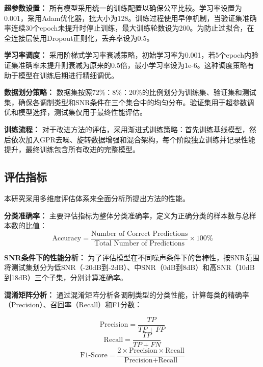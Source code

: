 \documentclass[conference]{IEEEtran}
\begin{document}
\textbf{超参数设置：}
所有模型采用统一的训练配置以确保公平比较。学习率设置为0.001，采用Adam优化器，批大小为128。训练过程使用早停机制，当验证集准确率连续30个epoch未提升时停止训练，最大训练轮数设为200。为防止过拟合，在全连接层使用Dropout正则化，丢弃率设为0.5。

\textbf{学习率调度：}
采用阶梯式学习率衰减策略，初始学习率为0.001，若5个epoch内验证集准确率未提升则衰减为原来的0.5倍，最小学习率设为1e-6。这种调度策略有助于模型在训练后期进行精细调优。

\textbf{数据划分策略：}
数据集按照72\%：8\%：20\%的比例划分为训练集、验证集和测试集，确保各调制类型和SNR条件在三个集合中的均匀分布。验证集用于超参数调优和模型选择，测试集仅用于最终性能评估。

\textbf{训练流程：}
对于改进方法的评估，采用渐进式训练策略：首先训练基线模型，然后依次加入GPR去噪、旋转数据增强和混合架构，每个阶段独立训练并记录性能提升，最终训练包含所有改进的完整模型。

\subsection{评估指标}

本研究采用多维度评估体系来全面分析所提出方法的性能。

\textbf{分类准确率：}
主要评估指标为整体分类准确率，定义为正确分类的样本数与总样本数的比值：
\begin{equation}
\text{Accuracy} = \frac{\text{Number of Correct Predictions}}{\text{Total Number of Predictions}} \times 100\%
\end{equation}

\textbf{SNR条件下的性能分析：}
为了评估模型在不同噪声条件下的鲁棒性，按SNR范围将测试集划分为低SNR（-20dB到-2dB）、中SNR（0dB到8dB）和高SNR（10dB到18dB）三个子集，分别计算准确率。

\textbf{混淆矩阵分析：}
通过混淆矩阵分析各调制类型的分类性能，计算每类的精确率（Precision）、召回率（Recall）和F1分数：


\begin{equation}
\text{Precision} = \frac{TP}{TP + FP}
\end{equation}
\begin{equation}
\text{Recall} = \frac{TP}{TP + FN}
\end{equation}
\begin{equation}
\text{F1-Score} = \frac{2 \times \text{Precision} \times \text{Recall}}{\text{Precision} + \text{Recall}}
\end{equation}
\end{document}
